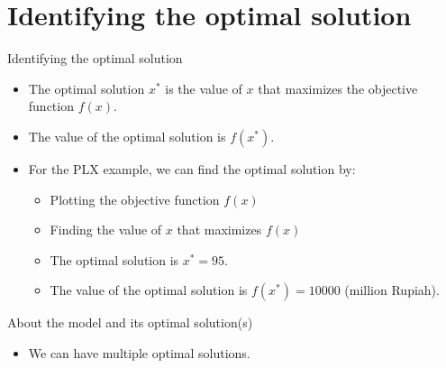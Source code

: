 \documentclass [xcolor=svgnames, handout]{beamer}
\begin{document}
\section{Identifying the optimal solution}
\begin{frame}{Identifying the optimal solution}
    \begin{itemize}[<+->]
        \item The optimal solution $x^*$ is the value of $x$ that maximizes the objective function $f(x)$.
        \item The value of the optimal solution is $f(x^*)$.
        \item For the PLX example, we can find the optimal solution by:
        \begin{itemize}[<+->]
            \item Plotting the objective function $f(x)$
            \item Finding the value of $x$ that maximizes $f(x)$
            \begin{figure}
                \centering
                        
            \end{figure} 
            \item The optimal solution is $x^* = 95$.
            \item The value of the optimal solution is $f(x^*) = 10000$ (million Rupiah).   
        \end{itemize}
    \end{itemize}
\end{frame}


\begin{frame}{About the model and its optimal solution(s)}
    \begin{itemize}[<+->]
        \item We can have multiple optimal solutions.
        \begin{figure}
            \centering
            ~        
        \end{figure} 
    \end{itemize}        
\end{frame}
\end{document}

